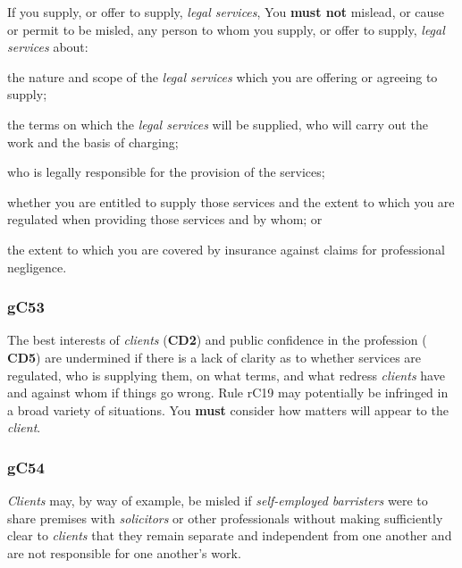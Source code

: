 


If you supply, or offer to supply, \emph{legal services}, You \textcolor{myred}{\textbf{must not}}
mislead, or cause or permit to be misled, any person to whom you supply,
or offer to supply, \emph{legal services} about:
\begin{numlist}\item the nature and scope of the \emph{legal services} which you are
offering or agreeing to supply;
\item the terms on which the \emph{legal services} will be supplied, who
will carry out the work and the basis of charging;
\item who is legally responsible for the provision of the services;
\item whether you are entitled to supply those services and the extent to
which you are regulated when providing those services and by whom; or
\item the extent to which you are covered by insurance against claims for
professional negligence.
\end{numlist}


\subsubsection{\color{darkgrey}gC53}

The best interests of \emph{clients} (\textcolor{mygold}{\textbf{CD2}}) and public confidence in the
profession ( \textbf{\textcolor{mygold}{CD5}}) are undermined if there is a lack of clarity as to
whether services are regulated, who is supplying them, on what terms,
and what redress \emph{clients} have and against whom if things go
wrong. Rule rC19 may potentially be infringed in a broad variety of
situations. You \textcolor{myred}{\textbf{must}} consider how matters will appear to the
\emph{client}.

\subsubsection{\color{darkgrey}gC54}

\emph{Clients} may, by way of example, be misled if \emph{self-employed
barristers} were to share premises with \emph{solicitors} or other
professionals without making sufficiently clear to \emph{clients} that
they remain separate and independent from one another and are not
responsible for one another's work.

